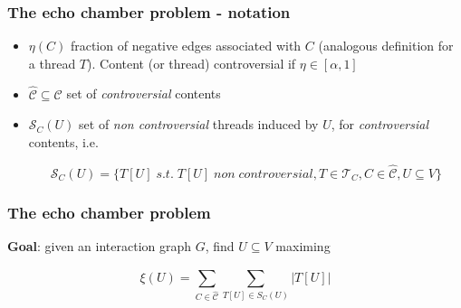 \documentclass{beamer}
\begin{document}
\begin{frame}[c]
    \frametitle{The echo chamber problem - notation}
    \begin{itemize}
        \item $\eta(C)$ fraction of negative edges associated with $C$
            (analogous definition for a thread $T$). Content (or thread)
            controversial if $\eta \in [\alpha, 1]$
        \item $\hat{\mathcal{C} } \subseteq \mathcal{C} $ set of \textit{controversial}
            contents

        \item $\mathcal{S} _C (U)$ set of \textit{non controversial} threads
            induced by $U$, for \textit{controversial} contents, i.e.

            {\small
                \begin{equation}
                    \mathcal{S} _{C} (U) = \{ T[U] \; s.t. \; T[U] \; non \;
                        controversial, T \in \mathcal{T} _{C}, C
                    \in \hat{\mathcal{C}}, U \subseteq V\}
                \end{equation}
            }
    \end{itemize}

\end{frame}

\begin{frame}[c]
    \frametitle{The echo chamber problem}
    \textbf{Goal}: given an interaction graph $G$, find $U \subseteq V$ maximing

    \begin{equation}
        \xi (U) = \sum^{}_{C \in \hat{\mathcal{C}} } \sum^{}_{T[U] \in S_C (U)}
        | T[U] |
    \end{equation}
\end{frame}
\end{document}
